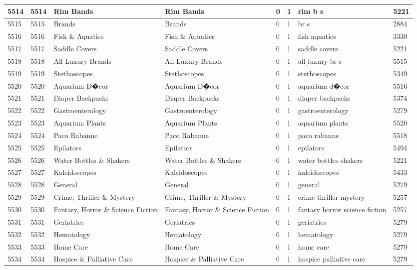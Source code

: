 \begin{longtable}{|l|l|l|l|l|l|l|l|}
5514 & 5514 & Rim Bands & Rim Bands & 0 & 1 & rim b s & 5221 \\ \hline 
5515 & 5515 & Brands & Brands & 0 & 1 & br s & 2884 \\ \hline 
5516 & 5516 & Fish \& Aquatics & Fish \& Aquatics & 0 & 1 & fish aquatics & 3330 \\ \hline 
5517 & 5517 & Saddle Covers & Saddle Covers & 0 & 1 & saddle covers & 5221 \\ \hline 
5518 & 5518 & All Luxury Brands & All Luxury Brands & 0 & 1 & all luxury br s & 5515 \\ \hline 
5519 & 5519 & Stethoscopes & Stethoscopes & 0 & 1 & stethoscopes & 5349 \\ \hline 
5520 & 5520 & Aquarium D�cor & Aquarium D�cor & 0 & 1 & aquarium d�cor & 5516 \\ \hline 
5521 & 5521 & Diaper Backpacks & Diaper Backpacks & 0 & 1 & diaper backpacks & 5374 \\ \hline 
5522 & 5522 & Gastroenterology & Gastroenterology & 0 & 1 & gastroenterology & 5279 \\ \hline 
5523 & 5523 & Aquarium Plants & Aquarium Plants & 0 & 1 & aquarium plants & 5520 \\ \hline 
5524 & 5524 & Paco Rabanne & Paco Rabanne & 0 & 1 & paco rabanne & 5518 \\ \hline 
5525 & 5525 & Epilators & Epilators & 0 & 1 & epilators & 5494 \\ \hline 
5526 & 5526 & Water Bottles \& Shakers & Water Bottles \& Shakers & 0 & 1 & water bottles shakers & 5221 \\ \hline 
5527 & 5527 & Kaleidoscopes & Kaleidoscopes & 0 & 1 & kaleidoscopes & 5433 \\ \hline 
5528 & 5528 & General & General & 0 & 1 & general & 5279 \\ \hline 
5529 & 5529 & Crime, Thriller \& Mystery & Crime, Thriller \& Mystery & 0 & 1 & crime thriller mystery & 5257 \\ \hline 
5530 & 5530 & Fantasy, Horror \& Science Fiction & Fantasy, Horror \& Science Fiction & 0 & 1 & fantasy horror science fiction & 5257 \\ \hline 
5531 & 5531 & Geriatrics & Geriatrics & 0 & 1 & geriatrics & 5279 \\ \hline 
5532 & 5532 & Hematology & Hematology & 0 & 1 & hematology & 5279 \\ \hline 
5533 & 5533 & Home Care & Home Care & 0 & 1 & home care & 5279 \\ \hline 
5534 & 5534 & Hospice \& Palliative Care & Hospice \& Palliative Care & 0 & 1 & hospice palliative care & 5279 \\ \hline 

\end{longtable}
